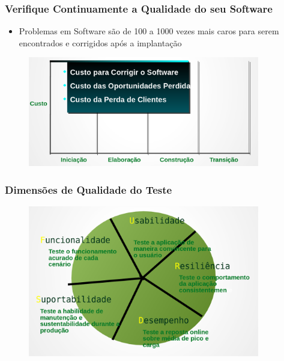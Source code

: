 \begin{frame}
\frametitle{Verifique Continuamente a Qualidade do seu Software}
 \begin{itemize}
  \item Problemas em Software são de 100 a 1000 vezes mais caros para serem  encontrados e corrigidos após a implantação
 \end{itemize}
\begin{figure}
   \centering
   \includegraphics[width = 0.9\textwidth]{figs/fig14.png}
  \end{figure}
\end{frame}


\begin{frame}
\frametitle{Dimensões de Qualidade do Teste}
\begin{figure}
   \centering
   \includegraphics[width = 0.9\textwidth]{figs/fig15.png}
  \end{figure}
\end{frame}


